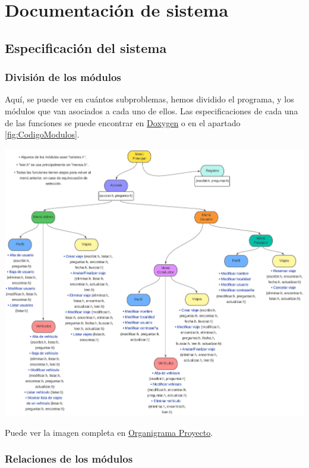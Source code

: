 

\section{Documentación de sistema}

\subsection{Especificación del sistema}

\subsubsection{División de los módulos}

Aquí, se puede ver en cuántos subproblemas, hemos dividido el programa, y los módulos que van asociados a cada uno de ellos.
Las especificaciones de cada una de las funciones se puede encontrar en \href{DOC_DOXYGEN/index.html}{Doxygen} o en el apartado \ref{fig:CodigoModulos}.


\begin{center}
  \includegraphics[width=1.15\textwidth]{FOTOS/Organigrama_Proyecto.jpeg}
\end{center}

Puede ver la imagen completa en \href{FOTOS/Organigrama_Proyecto.jpeg}{Organigrama Proyecto}.

\subsubsection{Relaciones de los módulos}

